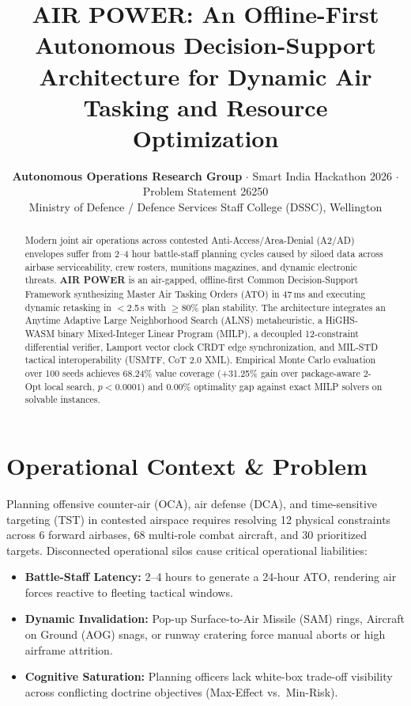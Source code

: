 \documentclass[10pt,twocolumn,a4paper]{article}
\title{\vspace{-1.2em}\fontsize{13pt}{15pt}\selectfont \textbf{AIR POWER: An Offline-First Autonomous Decision-Support Architecture for Dynamic Air Tasking and Resource Optimization}\vspace{-0.6em}}
\author{\fontsize{9pt}{11pt}\selectfont \textbf{Autonomous Operations Research Group} $\cdot$ Smart India Hackathon 2026 $\cdot$ Problem Statement 26250\\
\fontsize{8pt}{10pt}\selectfont Ministry of Defence / Defence Services Staff College (DSSC), Wellington\vspace{-1.2em}}
\date{}
\begin{document}
\maketitle
\thispagestyle{fancy}

\begin{abstract}
\scriptsize
Modern joint air operations across contested Anti-Access/Area-Denial (A2/AD) envelopes suffer from 2--4 hour battle-staff planning cycles caused by siloed data across airbase serviceability, crew rosters, munitions magazines, and dynamic electronic threats. \textbf{AIR POWER} is an air-gapped, offline-first Common Decision-Support Framework synthesizing Master Air Tasking Orders (ATO) in 47\,ms and executing dynamic retasking in $<$2.5\,s with $\ge$80\% plan stability. The architecture integrates an Anytime Adaptive Large Neighborhood Search (ALNS) metaheuristic, a HiGHS-WASM binary Mixed-Integer Linear Program (MILP), a decoupled 12-constraint differential verifier, Lamport vector clock CRDT edge synchronization, and MIL-STD tactical interoperability (USMTF, CoT 2.0 XML). Empirical Monte Carlo evaluation over 100 seeds achieves 68.24\% value coverage (+31.25\% gain over package-aware 2-Opt local search, $p<0.0001$) and 0.00\% optimality gap against exact MILP solvers on solvable instances.
\end{abstract}

\vspace{-0.5em}
\section{Operational Context \& Problem}
\footnotesize
Planning offensive counter-air (OCA), air defense (DCA), and time-sensitive targeting (TST) in contested airspace requires resolving 12 physical constraints across 6 forward airbases, 68 multi-role combat aircraft, and 30 prioritized targets. Disconnected operational silos cause critical operational liabilities:
\begin{itemize}
    \item \textbf{Battle-Staff Latency:} 2--4 hours to generate a 24-hour ATO, rendering air forces reactive to fleeting tactical windows.
    \item \textbf{Dynamic Invalidation:} Pop-up Surface-to-Air Missile (SAM) rings, Aircraft on Ground (AOG) snags, or runway cratering force manual aborts or high airframe attrition.
    \item \textbf{Cognitive Saturation:} Planning officers lack white-box trade-off visibility across conflicting doctrine objectives (Max-Effect vs.\ Min-Risk).
\end{itemize}
\end{document}
